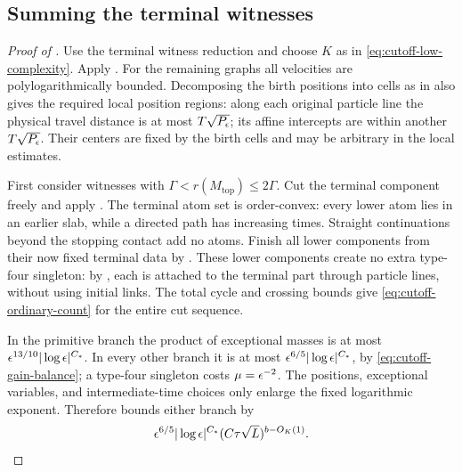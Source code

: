 \subsection{Summing the terminal witnesses}

\begin{proof}[Proof of ]
Use the terminal witness reduction and choose \(K\) as in
\eqref{eq:cutoff-low-complexity}.  Apply
.  For the remaining graphs all
velocities are polylogarithmically bounded.  Decomposing the
birth positions into cells as in
 also gives the required local position
regions: along each original particle line the physical
travel distance is at most \(T\sqrt{P_\epsilon}\); its affine
intercepts are within another \(T\sqrt{P_\epsilon}\).
Their centers are fixed by the birth cells and may be
arbitrary in the local estimates.

First consider witnesses with
\(\Gamma<r(M_{\mathrm{top}})\leq2\Gamma\).
Cut the terminal component freely and apply
. The terminal atom set is order-convex:
every lower atom lies in an earlier slab, while a directed path
has increasing times. Straight continuations beyond the stopping
contact add no atoms. Finish all lower components
from their now fixed terminal data by
.  These lower components create
no extra type-four singleton: by ,
each is attached to the terminal part through particle lines,
without using initial links. The total cycle and crossing bounds
give \eqref{eq:cutoff-ordinary-count} for the entire cut
sequence.

In the primitive branch the product of exceptional masses is
at most \(\epsilon^{13/10}|\log\epsilon|^{C_*}\).
In every other branch it is at most
\(\epsilon^{6/5}|\log\epsilon|^{C_*}\), by
\eqref{eq:cutoff-gain-balance}; a type-four singleton costs
\(\mu=\epsilon^{-2}\).  The positions, exceptional variables,
and intermediate-time choices only enlarge the fixed
logarithmic exponent.  Therefore
 bounds either branch by
\[
 \epsilon^{6/5}|\log\epsilon|^{C_*}
       (C\tau\sqrt L)^{b-O_K(1)}.
\]


\end{proof}
